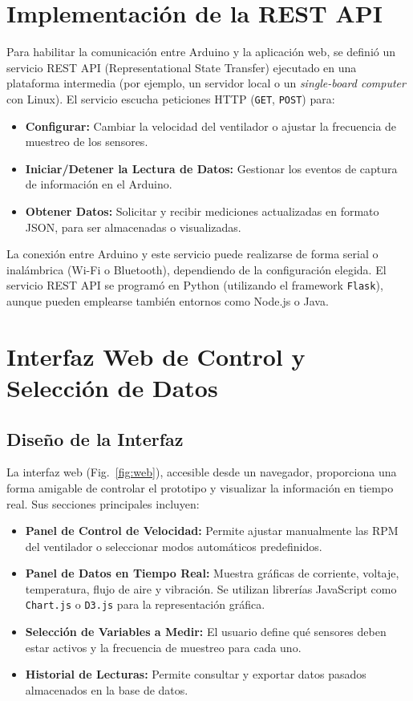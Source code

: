 \section{Implementación de la REST API}
Para habilitar la comunicación entre Arduino y la aplicación web, se definió un servicio REST API (Representational State Transfer) ejecutado en una plataforma intermedia (por ejemplo, un servidor local o un \textit{single-board computer} con Linux). El servicio escucha peticiones HTTP (\texttt{GET}, \texttt{POST}) para:
\begin{itemize}
    \item \textbf{Configurar:} Cambiar la velocidad del ventilador o ajustar la frecuencia de muestreo de los sensores.
    \item \textbf{Iniciar/Detener la Lectura de Datos:} Gestionar los eventos de captura de información en el Arduino.
    \item \textbf{Obtener Datos:} Solicitar y recibir mediciones actualizadas en formato JSON, para ser almacenadas o visualizadas.
\end{itemize}

La conexión entre Arduino y este servicio puede realizarse de forma serial o inalámbrica (Wi-Fi o Bluetooth), dependiendo de la configuración elegida. El servicio REST API se programó en Python (utilizando el framework \texttt{Flask}), aunque pueden emplearse también entornos como Node.js o Java.

\section{Interfaz Web de Control y Selección de Datos}
\subsection{Diseño de la Interfaz}
La interfaz web (Fig.~\ref{fig:web}), accesible desde un navegador, proporciona una forma amigable de controlar el prototipo y visualizar la información en tiempo real. Sus secciones principales incluyen:
\begin{itemize}
    \item \textbf{Panel de Control de Velocidad:} Permite ajustar manualmente las RPM del ventilador o seleccionar modos automáticos predefinidos.
    \item \textbf{Panel de Datos en Tiempo Real:} Muestra gráficas de corriente, voltaje, temperatura, flujo de aire y vibración. Se utilizan librerías JavaScript como \texttt{Chart.js} o \texttt{D3.js} para la representación gráfica.
    \item \textbf{Selección de Variables a Medir:} El usuario define qué sensores deben estar activos y la frecuencia de muestreo para cada uno.
    \item \textbf{Historial de Lecturas:} Permite consultar y exportar datos pasados almacenados en la base de datos.
\end{itemize}


